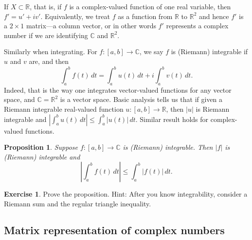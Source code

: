 \documentclass[12pt,openany]{book}
\newcommand{\sabs}[1]{\lvert {#1} \rvert}
\newcommand{\abs}[1]{\left\lvert {#1} \right\rvert}
\newcommand{\C}{{\mathbb{C}}}
\newcommand{\R}{{\mathbb{R}}}
\theoremstyle{plain}
\newtheorem{prop}[thm]{Proposition}
\theoremstyle{remark}
\theoremstyle{definition}
\newenvironment{exbox}{%
    \def\FrameCommand{\vrule width 1pt \relax\hspace{10pt}}%
    \MakeFramed{\advance\hsize-\width\FrameRestore}%
}{%
    \endMakeFramed
}
\theoremstyle{exercise}
\newtheorem{exercise}{Exercise}[section]
\theoremstyle{example}
\begin{document}
If $X \subset \R$, that is, if $f$ is a complex-valued
function of one real variable, then $f' = u' + iv'$.
Equivalently, we treat $f$ as a function from $\R$ to $\R^2$
and hence $f'$ is a $2 \times 1$ matrix---a column vector, or in other words
$f'$ represents a complex number if we are identifying $\C$ and $\R^2$.

Similarly when integrating.  For $f \colon [a,b] \to \C$,
we say $f$ is (Riemann) integrable if $u$ and $v$ are, and then
\begin{equation*}
\int_a^b f(t) \, dt = 
\int_a^b u(t) \, dt + i \int_a^b v(t) \, dt .
\end{equation*}
Indeed, that is the way one integrates vector-valued functions
for any vector space, and $\C = \R^2$ is a vector space.
Basic analysis tells us that
if given a Riemann integrable
real-valued function $u \colon [a,b] \to \R$,
then $\abs{u}$ is Riemann
integrable and $\abs{\int_a^b u(t) \, dt} \leq \int_a^b \sabs{u(t)} \, dt$.
Similar result holds for complex-valued functions.

\begin{prop} \label{prop:inttriangleineq}
Suppose $f \colon [a,b] \to \C$ is (Riemann) integrable.  Then $\sabs{f}$ is
(Riemann) integrable and
\begin{equation*}
\abs{\int_a^b f(t) \, dt} \leq 
\int_a^b \abs{f(t)} \, dt .
\end{equation*}
\end{prop}

\begin{exbox}
\begin{exercise}%
Prove the proposition.  Hint: After you know integrability, consider
a Riemann sum and the regular triangle inequality.
\end{exercise}
\end{exbox}

\subsection{Matrix representation of complex numbers}
\end{document}
